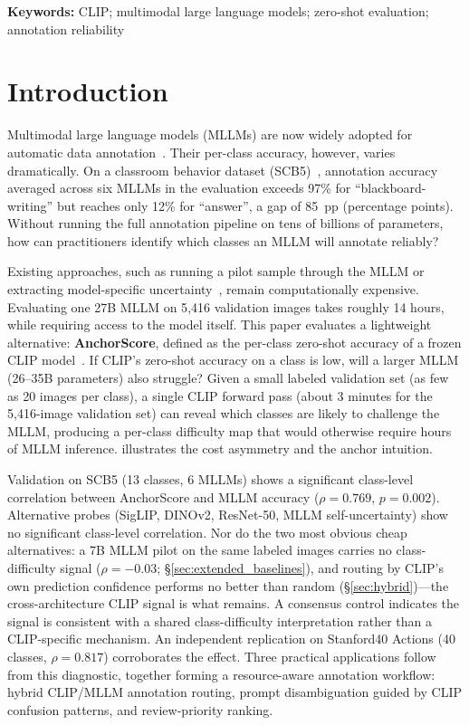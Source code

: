 \documentclass[11pt,a4paper]{article}
\begin{document}
\maketitle

\noindent\textbf{Keywords:} CLIP; multimodal large language models; zero-shot evaluation; annotation reliability

\section{Introduction}
\label{sec:intro}

Multimodal large language models (MLLMs) are now widely adopted for automatic data annotation~\cite{liu2023visual}. Their per-class accuracy, however, varies dramatically. On a classroom behavior dataset (SCB5)~\cite{ma2026agreement}, annotation accuracy averaged across six MLLMs in the evaluation exceeds 97\% for ``blackboard-writing'' but reaches only 12\% for ``answer'', a gap of 85~pp (percentage points). Without running the full annotation pipeline on tens of billions of parameters, how can practitioners identify which classes an MLLM will annotate reliably?

Existing approaches, such as running a pilot sample through the MLLM or extracting model-specific uncertainty~\cite{kadavath2022language}, remain computationally expensive. Evaluating one 27B MLLM on 5{,}416 validation images takes roughly 14 hours, while requiring access to the model itself. This paper evaluates a lightweight alternative: \textbf{AnchorScore}, defined as the per-class zero-shot accuracy of a frozen CLIP model~\cite{radford2021clip}. If CLIP's zero-shot accuracy on a class is low, will a larger MLLM (26--35B parameters) also struggle? Given a small labeled validation set (as few as 20 images per class), a single CLIP forward pass (about 3 minutes for the 5{,}416-image validation set) can reveal which classes are likely to challenge the MLLM, producing a per-class difficulty map that would otherwise require hours of MLLM inference.  illustrates the cost asymmetry and the anchor intuition.

Validation on SCB5 (13 classes, 6 MLLMs) shows a significant class-level correlation between AnchorScore and MLLM accuracy ($\rho=0.769$, $p=0.002$). Alternative probes (SigLIP, DINOv2, ResNet-50, MLLM self-uncertainty) show no significant class-level correlation. Nor do the two most obvious cheap alternatives: a 7B MLLM pilot on the same labeled images carries no class-difficulty signal ($\rho=-0.03$; \S\ref{sec:extended_baselines}), and routing by CLIP's own prediction confidence performs no better than random (\S\ref{sec:hybrid})---the cross-architecture CLIP signal is what remains. A consensus control indicates the signal is consistent with a shared class-difficulty interpretation rather than a CLIP-specific mechanism. An independent replication on Stanford40 Actions (40 classes, $\rho=0.817$) corroborates the effect. Three practical applications follow from this diagnostic, together forming a resource-aware annotation workflow: hybrid CLIP/MLLM annotation routing, prompt disambiguation guided by CLIP confusion patterns, and review-priority ranking.
\end{document}

